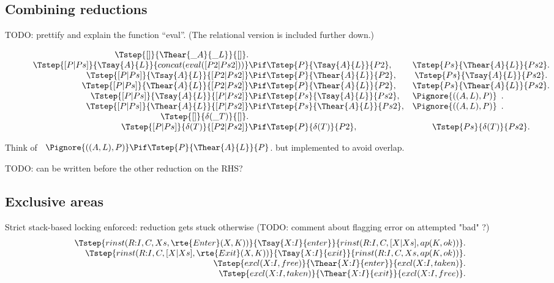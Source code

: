 \subsection{Combining reductions}

TODO: prettify and explain the function ``eval''. (The relational version is included further down.)

\[
\begin{array}{r@{}c@{}lcr@{}c@{}lr@{}c@{}l}
  \Tstep{[]}{\Thear{\_A}{\_L}}{[]}. & &
\\\Tstep{[ P | Ps ]}{\Tsay{A}{L}} {concat(eval([P2 | Ps2]))}  &\Pif& \Tstep{P}{\Tsay{A}{L}}{P2}  ,&  \Tstep{Ps}{\Thear{A}{L}}{Ps2}.
\\\Tstep{[ P | Ps ]}{\Tsay{A}{L}} {[ P2 | Ps2 ]}  &\Pif& \Tstep{P} {\Thear{A}{L}}{P2}   ,&  \Tstep{Ps}{\Tsay{A}{L}} {Ps2} .
\\\Tstep{[ P | Ps ]}{\Thear{A}{L}}{[ P2 | Ps2 ]}  &\Pif& \Tstep{P} {\Thear{A}{L}}{P2}   ,&  \Tstep{Ps}{\Thear{A}{L}}{Ps2} .
\\\Tstep{[ P | Ps ]}{\Tsay{A}{L}} {[ P  | Ps2 ]}  &\Pif& \Tstep{Ps}{\Tsay{A}{L}} {Ps2}  ,&  \multicolumn{3}{c}{\Pignore{((A,L),P)}}    .
\\\Tstep{[ P | Ps ]}{\Thear{A}{L}}{[ P  | Ps2 ]}  &\Pif& \Tstep{Ps}{\Thear{A}{L}}{Ps2}  ,&  \multicolumn{3}{c}{\Pignore{((A,L),P)}}    .
\\\Tstep{[]}{\delta(\_T)}{[]}. & &
\\\Tstep{[ P | Ps ]}{\delta(T)}{[ P2 | Ps2 ]}  &\Pif& \Tstep{P}{\delta(T)}{P2}    ,&  \Tstep{Ps}{\delta(T)}{Ps2}  .
\end{array}
\]

Think of
\(\begin{array}{r@{}c@{}l}\Pignore{((A,L),P)} \Pif
  \Tstep{P}{\Thear{A}{L}}{P}\end{array}\).
but implemented to avoid overlap.

TODO: can  be written before the other reduction on the RHS?



\subsection{Exclusive areas}

Strict stack-based locking enforced: reduction gets stuck otherwise
(TODO: comment about flagging error on attempted "bad" ?)
\[
\begin{array}{r@{}c@{}l}
  \Tstep{rinst(R{:}I, C, Xs,     \rte{Enter}(X,K))}{\Tsay{X{:}I}{enter}} {rinst(R{:}I, C, [X|Xs], ap(K,ok))}  .
\\\Tstep{rinst(R{:}I, C, [X|Xs], \rte{Exit}(X,K))} {\Tsay{X{:}I}{exit}}  {rinst(R{:}I, C, Xs,     ap(K,ok))}      .
\\\Tstep{excl(X{:}I, free)}                     {\Thear{X{:}I}{enter}}{excl(X{:}I, taken)}                 .
\\\Tstep{excl(X{:}I, taken)}                    {\Thear{X{:}I}{exit}} {excl(X{:}I, free)}                  .
\end{array}
\]

